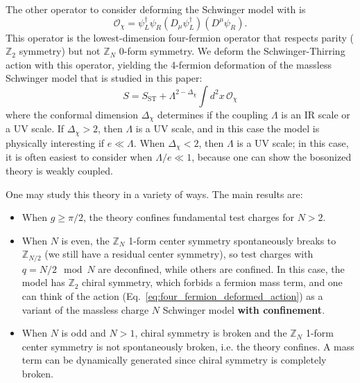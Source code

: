 The other operator to consider deforming the Schwinger model with is
\begin{equation}
	\mathcal O_\chi = \psi_L^\dagger \psi_R (D_\mu \psi_L^\dagger)(D^\mu \psi_R).
\end{equation}
This operator is the lowest-dimension four-fermion operator that respects parity ($\mathbb Z_2$ symmetry) but not $\mathbb Z_N$ 0-form symmetry. We deform the Schwinger-Thirring action with this operator, yielding the 4-fermion deformation of the massless Schwinger model that is studied in this paper:
\begin{equation}
	S = S_{\mathrm{ST}} + \Lambda^{2 - \Delta_\chi} \int d^2x\, \mathcal O_\chi
	\label{eq:four_fermion_deformed_action}
\end{equation}
where the conformal dimension $\Delta_\chi$ determines if the coupling $\Lambda$ is an IR scale or a UV scale. If $\Delta_\chi > 2$, then $\Lambda$ is a UV scale, and in this case the model is physically interesting if $e\ll \Lambda$. When $\Delta_\chi < 2$, then $\Lambda$ is a UV scale; in this case, it is often easiest to consider when $\Lambda / e \ll 1$, because one can show the bosonized theory is weakly coupled. 

One may study this theory in a variety of ways. The main results are:
\begin{itemize}
	\item When $g\geq \pi / 2$, the theory confines fundamental test charges for $N > 2$. 
	\item When $N$ is even, the $\mathbb Z_N$ 1-form center symmetry spontaneously breaks to $\mathbb Z_{N / 2}$ (we still have a residual center symmetry), so test charges with $q = N / 2 \mod N$ are deconfined, while others are confined. In this case, the model has $\mathbb Z_2$ chiral symmetry, which forbids a fermion mass term, and one can think of the action (Eq.~\eqref{eq:four_fermion_deformed_action}) as a variant of the massless charge $N$ Schwinger model \textbf{with confinement}. 
	\item When $N$ is odd and $N > 1$, chiral symmetry is broken and the $\mathbb Z_N$ 1-form center symmetry is not spontaneously broken, i.e. the theory confines. A mass term can be dynamically generated since chiral symmetry is completely broken. 
\end{itemize}

\newpage
